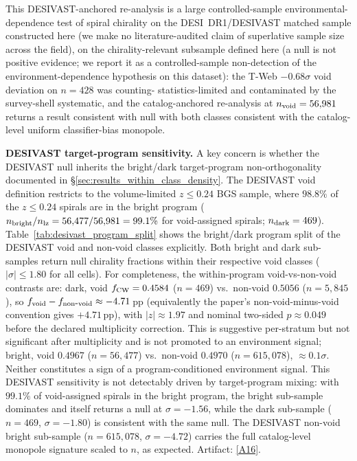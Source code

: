 \documentclass[aps,prd,twocolumn,superscriptaddress,showpacs,preprintnumbers,nofootinbib,longbibliography,floatfix]{revtex4-2}
\newcommand{\repoBase}{https://github.com/Hubify-Projects/bigbounce/blob/main}
\begin{document}
This DESIVAST-anchored re-analysis is a large controlled-sample
environmental-dependence test of spiral chirality on the DESI~DR1/DESIVAST
matched sample constructed here (we make no literature-audited
claim of superlative sample size across the field),
on the chirality-relevant subsample defined here
(a null is not positive evidence; we report it as a controlled-sample
non-detection of the environment-dependence hypothesis on this dataset):
the T-Web $-0.68\sigma$ void deviation on $n = 428$ was counting-
statistics-limited and contaminated by the survey-shell systematic,
and the catalog-anchored re-analysis at $n_{\rm void} = 56{,}981$
returns a result consistent with null with both classes consistent with the catalog-
level uniform classifier-bias monopole.

\textbf{DESIVAST target-program sensitivity.}
A key concern is whether the DESIVAST null inherits the bright/dark
target-program non-orthogonality documented in
\S\ref{sec:results_within_class_density}. The DESIVAST void definition
restricts to the volume-limited $z \leq 0.24$ BGS sample, where
$98.8\%$ of the $z \leq 0.24$ spirals are in the bright program
($n_{\rm bright}/n_{\rm lz} = 56{,}477/56{,}981 = 99.1\%$ for
void-assigned spirals; $n_{\rm dark} = 469$).
Table~\ref{tab:desivast_program_split} shows the bright/dark
program split of the DESIVAST void and non-void classes explicitly.
Both bright and dark sub-samples return null
chirality fractions within their respective void classes
($|\sigma| \leq 1.80$ for all cells). For completeness, the
within-program void-vs-non-void contrasts are: dark, void
$f_{\rm CW}=0.4584$ ($n=469$) vs.\ non-void $0.5056$ ($n=5{,}845$), so
$f_{\rm void}-f_{\rm non\mbox{-}void}\approx-4.71$\,pp (equivalently the
paper's non-void-minus-void convention gives $+4.71$\,pp), with
$|z|\approx1.97$ and nominal two-sided $p\approx0.049$ before the declared
multiplicity correction. This is suggestive per-stratum but not significant
after multiplicity and is not promoted to an environment signal; bright, void
$0.4967$ ($n=56{,}477$) vs.\ non-void $0.4970$ ($n=615{,}078$),
${\approx}0.1\sigma$. Neither constitutes a sign of a
program-conditioned environment signal. This DESIVAST sensitivity is
not detectably driven by target-program mixing: with
$99.1\%$ of void-assigned spirals in the bright program, the bright
sub-sample dominates and itself returns a null at $\sigma = -1.56$,
while the dark sub-sample ($n = 469$, $\sigma = -1.80$) is consistent
with the same null. The DESIVAST non-void bright sub-sample
($n = 615{,}078$, $\sigma = -4.72$) carries the full catalog-level
monopole signature scaled to $n$, as expected.
Artifact:
\href{\repoBase/pipelines/p5\_desi\_chirality/outputs/28\_ext1\_desivast\_program\_split.json}{[A16]}.
\end{document}
